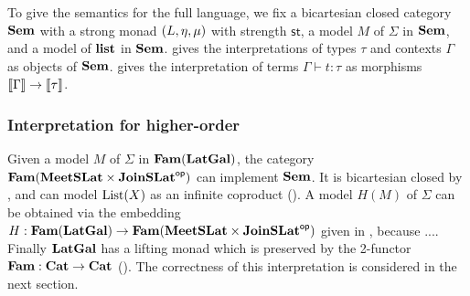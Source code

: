 To give the semantics for the full language, we fix a bicartesian closed category $\mathbf{Sem}$ with a strong monad
$(L, \eta, \mu)$ with strength $\mathsf{st}$, a model $M$ of $\Sigma$ in $\mathbf{Sem}$, and a model of $\mathbf{list}$
in $\mathbf{Sem}$.  gives the interpretations of types $\tau$ and contexts $\Gamma$ as objects
of $\mathbf{Sem}$.  gives the interpretation of terms $\Gamma \vdash t: \tau$ as morphisms
$\llbracket \Gamma \rrbracket \to \llbracket \tau \rrbracket$.

\subsubsection{Interpretation for higher-order \GPS}

Given a model $M$ of $\Sigma$ in $\mathbf{Fam}(\mathbf{LatGal})$, the category $\mathbf{Fam}(\mathbf{MeetSLat} \times \mathbf{JoinSLat}^{\mathsf{op}})$ can
implement $\mathbf{Sem}$. It is bicartesian closed by , and can model $\mathrm{List}(X)$ as an
infinite coproduct (). A model $H(M)$ of $\Sigma$ can be
obtained via the embedding $H: \mathbf{Fam}(\mathbf{LatGal}) \to \mathbf{Fam}(\mathbf{MeetSLat} \times \mathbf{JoinSLat}^{\mathsf{op}})$ given in
, because .... Finally $\mathbf{LatGal}$ has a lifting monad which is preserved by the 2-functor
$\mathbf{Fam}: \mathbf{Cat} \to \mathbf{Cat}$ (). The correctness of this interpretation is considered in
the next section.
